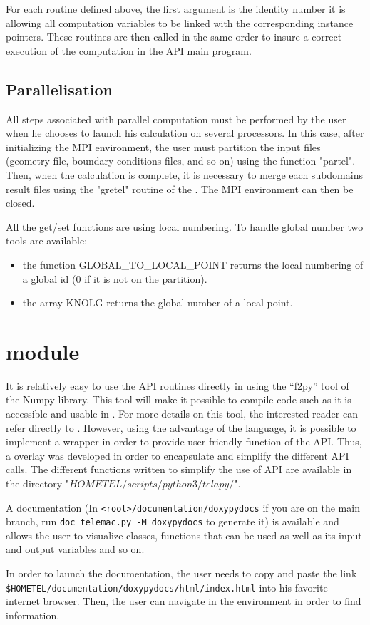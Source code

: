 For each routine defined above, the first argument is the identity number it is
allowing all computation variables to be linked with the corresponding instance
pointers. These routines are then called in the same order to insure a correct
execution of the computation in the API main program.

\subsection{Parallelisation}
\label{subsec:para}
All steps associated with parallel computation must be performed by the user
when he chooses to launch his calculation on several processors. In this case,
after initializing the MPI environment, the user must partition the input files
(geometry file, boundary conditions files, and so on) using the \fortran{}
function "partel". Then, when the calculation is complete, it is necessary to
merge each subdomains result files using the "gretel" routine of the
\telemacsystem{}. The MPI environment can then be closed.

All the get/set functions are using local numbering.
To handle global number two tools are available:
\begin{itemize}
  \item the function GLOBAL\_TO\_LOCAL\_POINT returns the local numbering of a
    global id
(0 if it is not on the partition).
  \item the array KNOLG returns the global number of a local point.
\end{itemize}

\section{\TelApy{} \python{} module}

It is relatively easy to use the \fortran{} API routines directly in \python{}
using the ``f2py'' tool of the \python{} Numpy library. This tool will make it
possible to compile \fortran{} code such as it is accessible and usable in
\python{}. For more details on this tool, the interested reader can refer
directly to \cite{Peterson2009}. However, using the advantage of the \python{}
language, it is possible to implement a wrapper in order to provide user
friendly function of the \fortran{} API\@. Thus, a \python{} overlay was
developed in order to encapsulate and simplify the different API \python{}
calls. The different \python{} functions written to simplify the use of API are
available in the directory "$HOMETEL/scripts/python3/telapy/$".

A \doxygen documentation (In \verb!<root>/documentation/doxypydocs! if you are
on the main branch, run \verb!doc_telemac.py -M doxypydocs! to generate it) is
available and allows the user to visualize \python{} classes, functions that
can be used as well as its input and output variables and so on.

In order to launch the \doxygen documentation, the user needs to copy and paste
the link \verb!$HOMETEL/documentation/doxypydocs/html/index.html! into his
favorite internet browser. Then, the user can navigate in the \doxygen
environment in order to find information.

